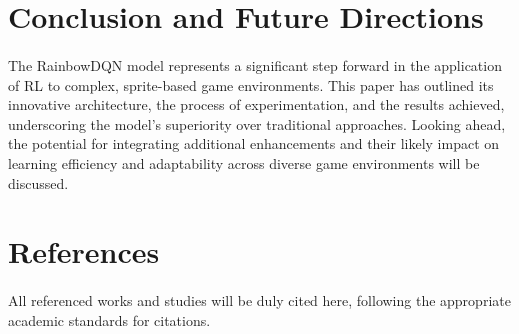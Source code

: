 \documentclass[12pt,a4paper]{article}
\begin{document}
\section{Conclusion and Future Directions}
\paragraph{}
The RainbowDQN model represents a significant step forward in the application of RL to complex, sprite-based game environments. This paper has outlined its innovative architecture, the process of experimentation, and the results achieved, underscoring the model's superiority over traditional approaches. Looking ahead, the potential for integrating additional enhancements and their likely impact on learning efficiency and adaptability across diverse game environments will be discussed.

\section{References}
\paragraph{}
All referenced works and studies will be duly cited here, following the appropriate academic standards for citations.
\end{document}
